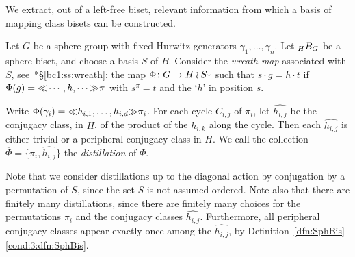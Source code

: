 \documentclass{amsart}
\begin{document}
We extract, out of a left-free biset, relevant information from which
a basis of mapping class bisets can be constructed.
\begin{defn}[Distillations]\label{defn:distillation}
  Let $G$ be a sphere group with fixed Hurwitz generators
  $\gamma_1,\dots,\gamma_n$. Let $\subscript H B_G$ be a sphere biset,
  and choose a basis $S$ of $B$. Consider the \emph{wreath map}
  associated with $S$,
  see~\cite{bartholdi-dudko:bc1}*{\S\ref{bc1:ss:wreath}}: the map
  $\Phi\colon G\to H\wr S{\stackrel{\downarrow}{\smash.}}$ such that $s\cdot g=h\cdot t$ if
  $\Phi(g)={\ll}\cdots, h,\cdots{\gg}\pi$ with $s^\pi=t$ and the `$h$' in
  position $s$.

  Write $\Phi(\gamma_i)={\ll}h_{i,1},\dots,h_{i,d}{\gg}\pi_i$. For each
  cycle $C_{i,j}$ of $\pi_i$, let $\widehat{h_{i,j}}$ be the conjugacy
  class, in $H$, of the product of the $h_{i,k}$ along the cycle. Then
  each $\widehat{h_{i,j}}$ is either trivial or a peripheral conjugacy
  class in $H$. We call the collection
  $\overline\Phi=\{\pi_i,\widehat{h_{i,j}}\}$ the \emph{distillation}
  of $\Phi$.

  Note that we consider distillations up to the diagonal action by
  conjugation by a permutation of $S$, since the set $S$ is not
  assumed ordered. Note also that there are finitely many
  distillations, since there are finitely many choices for the
  permutations $\pi_i$ and the conjugacy classes
  $\widehat{h_{i,j}}$. Furthermore, all peripheral conjugacy classes
  appear exactly once among the $\widehat{h_{i,j}}$, by
  Definition~\ref{dfn:SphBis}\eqref{cond:3:dfn:SphBis}.
\end{defn}
\end{document}
